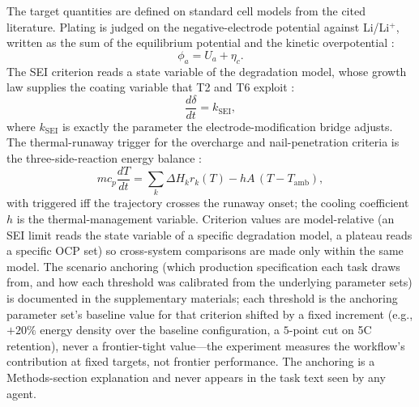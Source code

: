 The target quantities are defined on standard cell models from the cited
literature. Plating is judged on the negative-electrode potential against
Li/Li$^+$, written as the sum of the equilibrium potential and the kinetic
overpotential \cite{arora1999plating, ren2018plating}:
\begin{equation}
\label{eq:phi}
\phi_{a} = U_a + \eta_c.
\end{equation}
The SEI criterion reads a state variable of the degradation model, whose
growth law supplies the coating variable that T2 and T6 exploit
\cite{peled1979sei, okane2022pccp}:
\begin{equation}
\label{eq:sei}
\frac{d\delta}{dt} = k_{\mathrm{SEI}},
\end{equation}
where $k_{\mathrm{SEI}}$ is exactly the parameter the electrode-modification
bridge adjusts. The thermal-runaway trigger for the overcharge and
nail-penetration criteria is the three-side-reaction energy balance
\cite{wang2012thermalrunaway}:
\begin{equation}
\label{eq:tr}
m c_p \frac{dT}{dt} = \sum_k \Delta H_k r_k(T) - hA\,(T - T_{\mathrm{amb}}),
\end{equation}
with $\text{triggered}$ iff the trajectory crosses the runaway onset; the
cooling coefficient $h$ is the thermal-management variable. Criterion values are model-relative (an SEI limit reads the state variable
of a specific degradation model, a plateau reads a specific OCP set) so
cross-system comparisons are made only within the same model. The scenario
anchoring (which production
specification each task draws from, and how each threshold was calibrated
from the underlying parameter sets) is documented in the supplementary
materials; each threshold is the anchoring parameter set's baseline value
for that criterion shifted by a fixed increment (e.g., $+20\%$ energy
density over the baseline configuration, a $5$-point cut on 5C retention),
never a frontier-tight value---the experiment measures the workflow's
contribution at fixed targets, not frontier performance. The anchoring is
a Methods-section explanation and never appears in the task text seen by
any agent.

